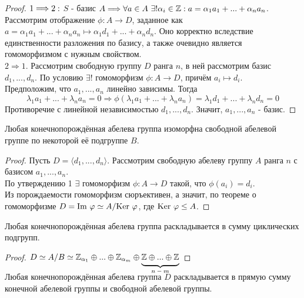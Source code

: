 \begin{proof}
    $ \\ 1 \Longrightarrow 2:$  $S$ - базис $A \Longrightarrow \forall a \in A \ \exists! \alpha_i  \in \Z : a = \alpha_1a_1 + ... + \alpha_na_n$.\\
    Рассмотрим отображение $\phi: A \rightarrow D$, заданное как $a = \alpha_1a_1 + ... + \alpha_na_n \mapsto \alpha_1d_1 + ... + \alpha_nd_n$. Оно корректно вследствие единственности разложения по базису, а также очевидно является гомоморфизмом с нужным свойством.\\
    $2 \Longrightarrow 1$. Рассмотрим свободную группу $D$ ранга $n$, в ней рассмотрим базис $d_1,...,d_n$. По условию $\exists!$ гомоморфизм $\phi: A \rightarrow D$, причём $a_i \mapsto d_i$.\\
    Предположим, что $a_1,...,a_n$ линейно зависимы. Тогда \[\lambda_1a_1 +...+\lambda_na_n = 0 \Longrightarrow \phi(\lambda_1a_1 +...+\lambda_na_n) = \lambda_1d_1 +...+\lambda_nd_n = 0\] 
    Противоречие с линейной независимостью $d_1,...,d_n$. Значит, $a_1,...,a_n$ - базис.
\end{proof}
\begin{consequensenum}
    Любая конечнопорождённая абелева группа изоморфна свободной абелевой группе по некоторой её подгруппе $B$.
\end{consequensenum}
\begin{proof}
    Пусть $D = \langle d_1,...,d_n \rangle$. Рассмотрим свободную абелеву группу $A$ ранга $n$ с базисом $a_1,...,a_n$. \\
    По утверждению 1 $\exists$ гомоморфизм $\phi: A \rightarrow D$ такой, что $\phi(a_i) = d_i$.\\
    Из порождаемости гомоморфизм сюръективен, а значит, по теореме о гомоморфизме $D = \textup{Im }\phi \simeq A/\textup{Ker }\phi$, где $\textup{Ker }\phi \leq A$. 
\end{proof}
\begin{consequensenum}
    Любая конечнопорождённая абелева группа раскладывается в сумму циклических подгрупп.
\end{consequensenum}
\begin{proof}
    $D \simeq A/B \simeq \Z_{\alpha_1} \oplus ... \oplus \Z_{\alpha_m} \oplus \undermat{n-m}{\Z\oplus ... \oplus \Z}\\$
\end{proof}
\begin{consequensenum}
    Любая конечнопорождённая абелева группа $D$ раскладывается в прямую сумму конечной абелевой группы и свободной абелевой группы. 
\end{consequensenum}

